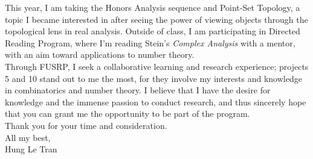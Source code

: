 \documentclass[a4paper, 11pt]{extarticle}
\begin{document}
This year, I am taking the Honors Analysis sequence and Point-Set Topology, a topic I became interested in after seeing the power of viewing objects through the topological lens in real analysis. Outside of class, I am participating in Directed Reading Program, where I'm reading Stein's \textit{Complex Analysis} with a mentor, with an aim toward applications to number theory.\\

Through FUSRP, I seek a collaborative learning and research experience; projects 5 and 10 stand out to me the most, for they involve my interests and knowledge in combinatorics and number theory.  I believe that I have the desire for knowledge and the immense passion to conduct research, and thus sincerely hope that you can grant me the opportunity to be part of the program.\\

Thank you for your time and consideration.\\

All my best,\\

Hung Le Tran
\end{document}
